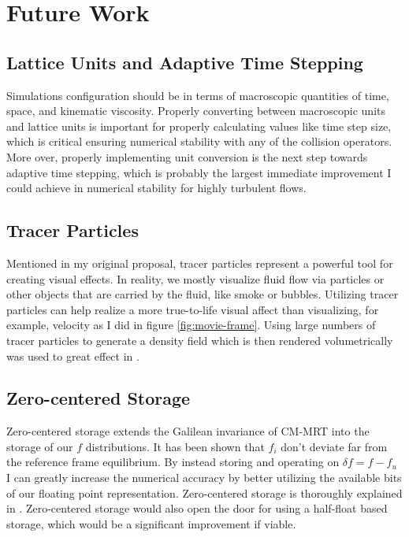 \section{Future Work}\label{sec:futurework}
\subsection{Lattice Units and Adaptive Time Stepping}
Simulations configuration should be in terms of macroscopic
quantities of time, space, and kinematic viscosity.
Properly converting between macroscopic units and lattice units
is important for properly calculating values like time step size,
which is critical ensuring numerical stability with any 
of the collision operators.
More over, properly implementing unit conversion 
is the next step towards adaptive time stepping,
which is probably the largest immediate improvement I could achieve
in numerical stability for highly turbulent flows.

\subsection{Tracer Particles}
Mentioned in my original proposal, tracer particles
represent a powerful tool for creating visual effects.
In reality, we mostly visualize fluid flow via particles or
other objects that are carried by the fluid, like smoke or bubbles.
Utilizing tracer particles can help realize a more true-to-life
visual affect than visualizing, for example, velocity as I did in
figure \ref{fig:movie-frame}.
Using large numbers of tracer particles to generate a 
density field which is then rendered volumetrically was used to 
great effect in \cite{Li2020, Li2024, Lyu2021}.

\subsection{Zero-centered Storage}
Zero-centered storage extends the Galilean invariance of CM-MRT 
into the storage of our $f$ distributions.
It has been shown that $f_i$ don't deviate far from the reference
frame equilibrium.
By instead storing and operating on $\delta f = f - f_u$ 
I can greatly increase the numerical accuracy by better
utilizing the available bits of our floating point representation.
Zero-centered storage is thoroughly explained in \cite{Hennig2023}.
Zero-centered storage would also open the door for using a half-float 
based storage, which would be a significant improvement if viable.

